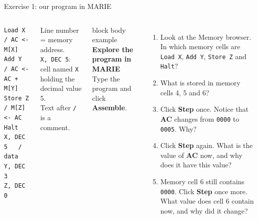 \documentclass[aspectratio=169,10pt]{beamer}
\begin{document}
\begin{frame}[fragile]{Exercise 1: our program in MARIE}
  \begin{columns}[T,onlytextwidth]
\begin{lstlisting}[style=marie]
Load X     / AC <- M[X]
Add Y      / AC <- AC + M[Y]
Store Z    / M[Z] <- AC
Halt
X, DEC 5   / data
Y, DEC 3
Z, DEC 0
\end{lstlisting}
      \vspace{0.05cm}
      \scriptsize
      Line number = memory address.\\
      \texttt{X, DEC 5}: cell named \texttt{X} holding the decimal value 5.\\
      Text after \texttt{/} is a comment.
      \begin{beamercolorbox}[rounded=true,sep=0.12cm,wd=\linewidth]{block body example}
        \small\textbf{Explore the program in MARIE}\\[0.05cm]
        \footnotesize Type the program and click \textbf{Assemble}.
      \end{beamercolorbox}
      \vspace{0.1cm}
      \footnotesize
      \begin{enumerate}\setlength{\itemsep}{3pt}
        \item Look at the Memory browser. In which memory cells are \texttt{Load X},
          \texttt{Add Y}, \texttt{Store Z} and \texttt{Halt}?
        \item What is stored in memory cells 4, 5 and 6?
        \item Click \textbf{Step} once. Notice that \textbf{AC} changes from \texttt{0000}
          to \texttt{0005}. Why?
        \item Click \textbf{Step} again. What is the value of \textbf{AC} now, and why does it have this value?
        \item Memory cell 6 still contains \texttt{0000}. Click \textbf{Step} once more.
          What value does cell 6 contain now, and why did it change?
      \end{enumerate}
  \end{columns}
\end{frame}
\end{document}
